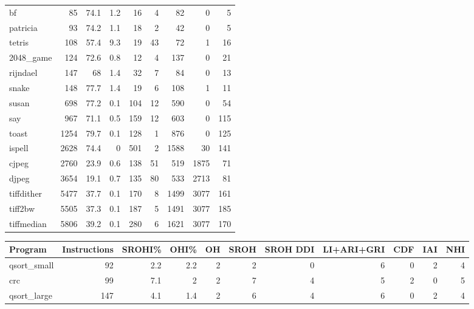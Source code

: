 \begin{tabular}{lrrrrrrrr}
 bf              &       85 &     74.1 &    1.2 &   16 &    4 &     82 &     0 &     5 \\
 patricia        &       93 &     74.2 &    1.1 &   18 &    2 &     42 &     0 &     5 \\
 tetris          &      108 &     57.4 &    9.3 &   19 &   43 &     72 &     1 &    16 \\
 2048\_game       &      124 &     72.6 &    0.8 &   12 &    4 &    137 &     0 &    21 \\
 rijndael        &      147 &     68   &    1.4 &   32 &    7 &     84 &     0 &    13 \\
 snake           &      148 &     77.7 &    1.4 &   19 &    6 &    108 &     1 &    11 \\
 susan           &      698 &     77.2 &    0.1 &  104 &   12 &    590 &     0 &    54 \\
 say             &      967 &     71.1 &    0.5 &  159 &   12 &    603 &     0 &   115 \\
 toast           &     1254 &     79.7 &    0.1 &  128 &    1 &    876 &     0 &   125 \\
 ispell          &     2628 &     74.4 &    0   &  501 &    2 &   1588 &    30 &   141 \\
 cjpeg           &     2760 &     23.9 &    0.6 &  138 &   51 &    519 &  1875 &    71 \\
 djpeg           &     3654 &     19.1 &    0.7 &  135 &   80 &    533 &  2713 &    81 \\
 tiffdither      &     5477 &     37.7 &    0.1 &  170 &    8 &   1499 &  3077 &   161 \\
 tiff2bw         &     5505 &     37.3 &    0.1 &  187 &    5 &   1491 &  3077 &   185 \\
 tiffmedian      &     5806 &     39.2 &    0.1 &  280 &    6 &   1621 &  3077 &   170 \\
\hline
\end{tabular}\begin{tabular}{lrrrrrrrrrr}
\hline
 Program         &   Instructions &   SROHI\% &   OHI\% &   OH &   SROH &   SROH DDI &   LI+ARI+GRI &   CDF &   IAI &   NHI \\
\hline
 qsort\_small     &             92 &      2.2 &    2.2 &    2 &      2 &          0 &            6 &     0 &     2 &     4 \\
 crc             &             99 &      7.1 &    2   &    2 &      7 &          4 &            5 &     2 &     0 &     5 \\
 qsort\_large     &            147 &      4.1 &    1.4 &    2 &      6 &          4 &            6 &     0 &     2 &     4 \\

\end{tabular}
